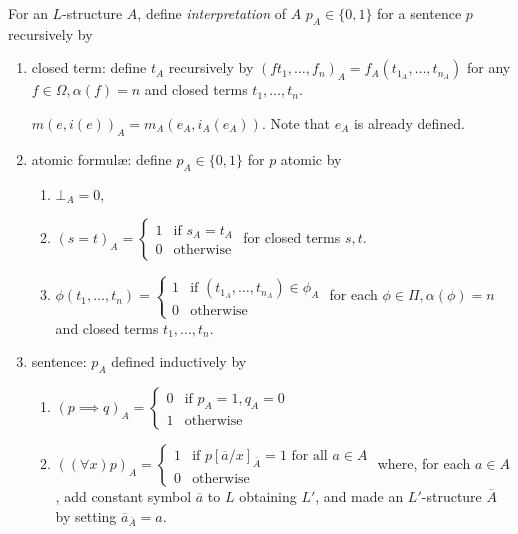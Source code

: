 \documentclass[a4paper]{article}
\begin{document}
\begin{definition}[Interpretation]
  For an \(L\)-structure \(A\), define \emph{interpretation} of \(A\) \(p_A \in \{0, 1\}\) for a sentence \(p\) recursively by
  \begin{enumerate}
  \item closed term: define \(t_A\) recursively by \((ft_1, \dots, f_n)_A = f_A(t_{1_A}, \dots, t_{n_A})\) for any \(f \in \Omega, \alpha(f) = n\) and closed terms \(t_1, \dots, t_n\).
    \begin{eg}
      \(m(e, i(e))_A = m_A(e_A, i_A(e_A))\). Note that \(e_A\) is already defined.
    \end{eg}
  \item atomic formulæ: define \(p_A \in \{0, 1\}\) for \(p\) atomic by
    \begin{enumerate}
    \item \(\bot_A = 0\),
    \item \((s = t)_A = \begin{cases} 1 & \text{if } s_A = t_A \\ 0 & \text{otherwise} \end{cases}\) for closed terms \(s, t\).
    \item \(\phi(t_1, \dots, t_n) = \begin{cases} 1 & \text{if } (t_{1_A}, \dots, t_{n_A}) \in \phi_A \\ 0 & \text{otherwise} \end{cases}\) for each \(\phi \in \Pi, \alpha(\phi) = n\) and closed terms \(t_1, \dots, t_n\).
    \end{enumerate}
  \item sentence: \(p_A\) defined inductively by
    \begin{enumerate}
    \item \((p \implies q)_A = \begin{cases} 0 & \text{if } p_A = 1, q_A = 0 \\ 1 & \text{otherwise} \end{cases}\)
    \item \(((\forall x) p)_A = \begin{cases} 1 & \text{if } p[\overline a/x]_{\overline A} = 1 \text{ for all } a \in A \\ 0 & \text{otherwise} \end{cases}\) where, for each \(a \in A\), add constant symbol \(\overline a\) to \(L\) obtaining \(L'\), and made an \(L'\)-structure \(\overline A\) by setting \(\overline a_{\overline A} = a\).
    \end{enumerate}
  \end{enumerate}
\end{definition}
\end{document}

